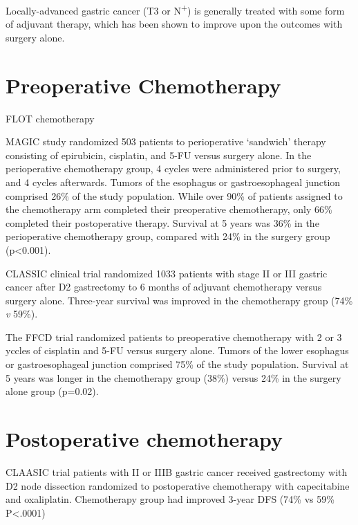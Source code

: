 \documentclass[
]{book}
\begin{document}
Locally-advanced gastric cancer (T3 or N\textsuperscript{+}) is generally treated with some form of adjuvant therapy, which has been shown to improve upon the outcomes with surgery alone.

\hypertarget{preoperative-chemotherapy}{%
\section{Preoperative Chemotherapy}\label{preoperative-chemotherapy}}

FLOT chemotherapy \citep{al-batran1948}

MAGIC study randomized 503 patients to perioperative `sandwich' therapy consisting of epirubicin, cisplatin, and 5-FU versus surgery alone. In the perioperative chemotherapy group, 4 cycles were administered prior to surgery, and 4 cycles afterwards. Tumors of the esophagus or gastroesophageal junction comprised 26\% of the study population. While over 90\% of patients assigned to the chemotherapy arm completed their preoperative chemotherapy, only 66\% completed their postoperative therapy. Survival at 5 years was 36\% in the perioperative chemotherapy group, compared with 24\% in the surgery group (p\textless0.001).\citep{cunningham11}

CLASSIC clinical trial randomized 1033 patients with stage II or III gastric cancer after D2 gastrectomy to 6 months of adjuvant chemotherapy versus surgery alone. Three-year survival was improved in the chemotherapy group (74\% \emph{v} 59\%).\citep{bang315}

The FFCD trial randomized patients to preoperative chemotherapy with 2 or 3 yccles of cisplatin and 5-FU versus surgery alone. Tumors of the lower esophagus or gastroesophageal junction comprised 75\% of the study population. Survival at 5 years was longer in the chemotherapy group (38\%) versus 24\% in the surgery alone group (p=0.02).\citep{ychou1715}

\hypertarget{postoperative-chemotherapy}{%
\section{Postoperative chemotherapy}\label{postoperative-chemotherapy}}

CLAASIC trial \citep{noh1389} \citep{bang315} patients with II or IIIB gastric cancer received gastrectomy with D2 node dissection randomized to postoperative chemotherapy with capecitabine and oxaliplatin. Chemotherapy group had improved 3-year DFS (74\% vs 59\% P\textless.0001)
\end{document}

